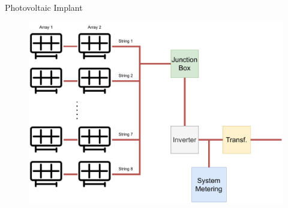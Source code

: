   \begin{frame}{Photovoltaic Implant}
    \begin{figure}
        \centering
        \includegraphics[width=.9\textwidth]{sections/0_intro/imgs/pvplant.pdf}
    \end{figure}
  \end{frame}
  
